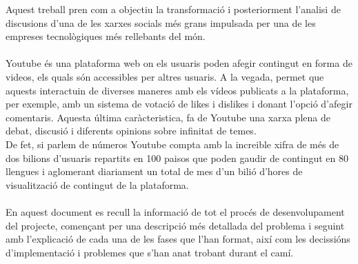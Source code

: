 
Aquest treball pren com a objectiu la transformació 
i posteriorment l'analisi de discusions d'una de les 
xarxes socials més grans impulsada per una de les empreses 
tecnològiques més rellebants del món.\\\\
%
Youtube és una plataforma web on els usuaris poden afegir
contingut en forma de videos, els quals són accessibles per 
altres usuaris. A la vegada, permet que aquests 
interactuin de diverses maneres amb els vídeos publicats
a la plataforma, per exemple, amb un sistema de votació 
de likes i dislikes i donant l'opció d'afegir comentaris.
Aquesta última caràcteristica, fa de Youtube una xarxa plena
de debat, discusió i diferents opinions sobre infinitat de 
temes.\\
De fet, si parlem de números Youtube compta amb la increible 
xifra de més de dos bilions d'usuaris repartits en 100 paisos 
que poden gaudir de contingut en 80 llengues i aglomerant diariament 
un total de mes d'un bilió d'hores de visualització de contingut 
de la plataforma.\\\\
%
En aquest document es recull la informació de tot el procés de desenvolupament
del projecte, començant per una descripció més detallada del problema i 
seguint amb l'explicació de cada una de les fases que l'han format, així com 
les decissións d'implementació i problemes que s'han anat trobant durant el camí.
